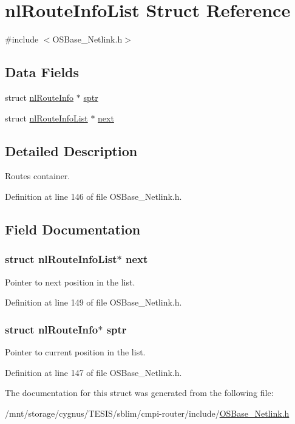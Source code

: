 \hypertarget{structnl_route_info_list}{
\section{nlRouteInfoList Struct Reference}
\label{structnl_route_info_list}
}


{\ttfamily \#include $<$OSBase\_\-Netlink.h$>$}\subsection*{Data Fields}
\begin{DoxyCompactItemize}
\item 
struct \hyperlink{structnl_route_info}{nlRouteInfo} $\ast$ \hyperlink{structnl_route_info_list_aa7b2d21659efe9119fbbb51ef1446c71}{sptr}
\item 
struct \hyperlink{structnl_route_info_list}{nlRouteInfoList} $\ast$ \hyperlink{structnl_route_info_list_a27db702c19ff3bf62f81260fa72008d5}{next}
\end{DoxyCompactItemize}


\subsection{Detailed Description}
Routes container. 

Definition at line 146 of file OSBase\_\-Netlink.h.

\subsection{Field Documentation}
\hypertarget{structnl_route_info_list_a27db702c19ff3bf62f81260fa72008d5}{
\subsubsection[{next}]{\setlength{\rightskip}{0pt plus 5cm}struct {\bf nlRouteInfoList}$\ast$ {\bf next}}}
\label{structnl_route_info_list_a27db702c19ff3bf62f81260fa72008d5}
Pointer to next position in the list. 

Definition at line 149 of file OSBase\_\-Netlink.h.\hypertarget{structnl_route_info_list_aa7b2d21659efe9119fbbb51ef1446c71}{
\subsubsection[{sptr}]{\setlength{\rightskip}{0pt plus 5cm}struct {\bf nlRouteInfo}$\ast$ {\bf sptr}}}
\label{structnl_route_info_list_aa7b2d21659efe9119fbbb51ef1446c71}
Pointer to current position in the list. 

Definition at line 147 of file OSBase\_\-Netlink.h.

The documentation for this struct was generated from the following file:\begin{DoxyCompactItemize}
\item 
/mnt/storage/cygnus/TESIS/sblim/cmpi-\/router/include/\hyperlink{_o_s_base___netlink_8h}{OSBase\_\-Netlink.h}\end{DoxyCompactItemize}

